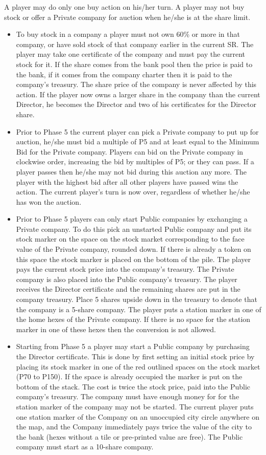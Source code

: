 \documentclass[a4paper]{article}
\begin{document}
A player may do only one buy action on his/her turn. A player may not buy stock
or offer a Private company for auction when he/she is at the share limit.
\begin{itemize}
	\item To buy stock in a company a player must not own 60\% or more in that
	company, or have sold stock of that company earlier in the current SR. The
	player may take one certificate of the company and must pay the current
	stock for it. If the share comes from the bank pool then the price is paid
	to the bank, if it comes from the company charter then it is paid to the
	company's treasury. The share price of the company is never affected by this
	action. If the player now owns a larger share in the company than the
	current Director, he becomes the Director and two of his certificates for
	the Director share.
	\item Prior to Phase 5 the current player can pick a Private company to put
	up for auction, he/she must bid a multiple of P5 and at least equal to the
	Minimum Bid for the Private company. Players can bid on the Private company
	in clockwise order, increasing the bid by multiples of P5; or they can pass.
	If a player passes then he/she may not bid during this auction any more.
	The player with the highest bid after all other players have passed wins
	the action. The current player's turn is now over, regardless of whether
	he/she has won the auction.
	\item Prior to Phase 5 players can only start Public companies by exchanging
	a Private company. To do this pick an unstarted Public company and put its
	stock marker on the space on the stock market corresponding to the face
	value of the Private company, rounded down. If there is already a token on
	this space the stock marker is placed on the bottom of the pile. The player
	pays the current stock price into the company's treasury. The Private
	company is also placed into the Public company's treasury. The player
	receives the Director certificate and the remaining shares are put in the
	company treasury. Place 5 shares upside down in the treasury to denote that
	the company is a 5-share company. The player puts a station marker in one
	of the home hexes of the Private company. If there is no space for the
	station marker in one of these hexes then the conversion is not allowed.
	\item Starting from Phase 5 a player may start a Public company by
	purchasing the Director certificate. This is done by first setting an
	initial stock price by placing its stock marker in one of the red outlined
	spaces on the stock market (P70 to P150). If the space is already occupied
	the marker is put on the bottom of the stack. The cost is twice the stock
	price, paid into the Public company's treasury. The company must have enough
	money for for the station marker of the company may not be started. The
	current player puts one station marker of the Company on an unoccupied city
	circle anywhere on the map, and the Company immediately pays twice the value
	of the city to the bank (hexes without a tile or pre-printed value are
	free). The Public company must start as a 10-share company.
\end{itemize}
\end{document}
